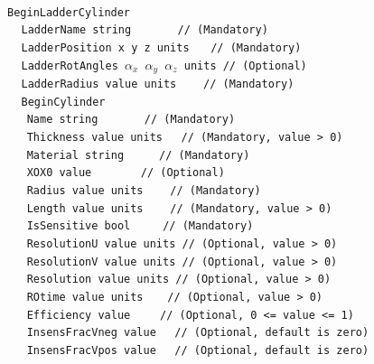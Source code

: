 ~\\
\noindent
{\tt BeginLadderCylinder} \\
$~~~~~${\tt LadderName       string                   $~~~~~~~~~~~~$   // (Mandatory)} \\
$~~~~~${\tt LadderPosition   x  y  z units                     $~~~$   // (Mandatory)} \\
$~~~~~${\tt LadderRotAngles  $\alpha_x$  $\alpha_y$  $\alpha_z$ units  // (Optional)}  \\
$~~~~~${\tt LadderRadius     value units                    $~~~~~$    // (Mandatory)}  \\
$~~~~~${\tt BeginCylinder} \\
$~~~~~~~${\tt Name             string                   $~~~~~~~~~~~~$   // (Mandatory)} \\
$~~~~~~~${\tt Thickness        value  units                       $~~$   // (Mandatory, value > 0)} \\
$~~~~~~~${\tt Material         string                       $~~~~~~~~$   // (Mandatory)} \\
$~~~~~~~${\tt XOX0             value                   $~~~~~~~~~~~~~$   // (Optional)}  \\
$~~~~~~~${\tt Radius           value units                     $~~~~~$   // (Mandatory)} \\
$~~~~~~~${\tt Length           value units                     $~~~~~$   // (Mandatory, value > 0)} \\
$~~~~~~~${\tt IsSensitive      bool                          $~~~~~~~$   // (Mandatory)} \\
$~~~~~~~${\tt ResolutionU      value units                               // (Optional, value > 0)} \\
$~~~~~~~${\tt ResolutionV      value units                               // (Optional, value > 0)} \\
$~~~~~~~${\tt Resolution       value units                               // (Optional, value > 0)} \\
$~~~~~~~${\tt ROtime           value units                      $~~~~$   // (Optional, value > 0)} \\
$~~~~~~~${\tt Efficiency       value                          $~~~~~~$   // (Optional, 0 <= value <= 1)} \\
$~~~~~~~${\tt InsensFracVneg   value                              $~~$   // (Optional, default is zero)} \\
$~~~~~~~${\tt InsensFracVpos   value                              $~~$   // (Optional, default is zero)} \\
